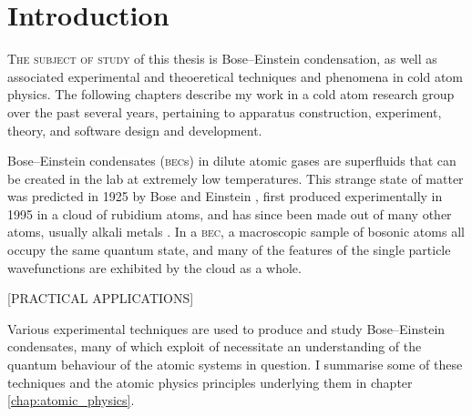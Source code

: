 \chapter{Introduction}\label{chap:introduction}

\lettrine[lines=3]{T}{he subject of study} of this thesis is Bose--Einstein condensation, as well as associated experimental and theoeretical techniques and phenomena in cold atom physics. The following chapters describe my work in a cold atom research group over the past several years, pertaining to apparatus construction, experiment, theory, and software design and development.

Bose--Einstein condensates (\textsc{bec}s) in dilute atomic gases are superfluids that can be created in the lab at extremely low temperatures. This strange state of matter was predicted in 1925 by Bose and Einstein \cite{bose_plancks_1924, einstein_quantentheorie_1925} , first produced experimentally in 1995 \cite{anderson_observation_1995} in a cloud of rubidium atoms, and has since been made out of many other atoms, usually alkali metals \cite{davis_bose-einstein_1995, modugno_bose-einstein_2001, bradley_bose-einstein_1997, weber_bose-einstein_2003}. In a \textsc{bec}, a macroscopic sample of bosonic atoms all occupy the same quantum state, and many of the features of the single particle wavefunctions are exhibited by the cloud as a whole.

[PRACTICAL APPLICATIONS]

Various experimental techniques are used to produce and study Bose--Einstein condensates, many of which exploit of necessitate an understanding of the quantum behaviour of the atomic systems in question. I summarise some of these techniques and the atomic physics principles underlying them in chapter \ref{chap:atomic_physics}.

